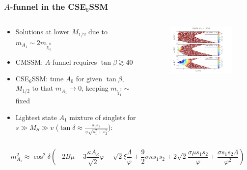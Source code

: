 \documentclass[10pt,aspectratio=169]{beamer}
\begin{document}
\begin{frame}
  \frametitle{$A$-funnel in the CSE$_6$SSM}
  \begin{columns}[t]
    \begin{column}{0.5\textwidth}
      \begin{itemize} \itemsep1.5em
        \vfill
      \item Solutions at lower $M_{1/2}$ due to
        $m_{A_1} \sim 2 m_{\tilde{\chi}_1^0}$
        \vfill
      \item CMSSM: $A$-funnel requires $\tan\beta \gtrsim 40$
        \vfill
      \item CSE$_6$SSM: tune $A_0$ for given $\tan\beta$, $M_{1/2}$ to that
        $m_{A_1} \rightarrow 0$, keeping $m_{\tilde{\chi}_1^0} \sim$ fixed
        \vfill
      \item Lightest state $A_1$ mixture of singlets for $s \gg M_S \gg v$
        ($\tan\delta \approx \frac{s_1 s_2}{\varphi \sqrt{s_1^2 + s_2^2}}$):
        \vfill
      \end{itemize}
    \end{column}
    \begin{column}{0.5\textwidth}
      \vspace{-40pt}
      \begin{figure}
        \includegraphics[width=8cm]{cmssm_a_funnel}
      \end{figure}
    \end{column}
  \end{columns}
  \vspace{10pt}
  \begin{equation*}
    m_{A_1}^2 \approx \cos^2\delta \left ( -2 B\mu
    - 3 \frac{\kappa A_\kappa}{\sqrt{2}} \varphi
    - \sqrt{2} \xi \frac{\Lambda}{\varphi} + \frac{9}{2}
    \sigma \kappa s_1 s_2 + 2\sqrt{2} \frac{\sigma \mu s_1 s_2}{\varphi}
    + \frac{\sigma s_1 s_2 \Lambda}{\varphi^2} \right )
  \end{equation*}
\end{frame}
\end{document}
